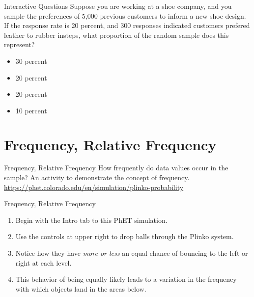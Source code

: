 \documentclass{beamer}
\begin{document}
\begin{frame}{Interactive Questions}
Suppose you are working at a shoe company, and you sample the preferences of 5,000 previous customers to inform a new shoe design.  If the response rate is 20 percent, and 300 responses indicated customers prefered leather to rubber insteps, what proportion of the random sample does this represent?
\begin{itemize}
\item 30 percent
\item 20 percent
\item 20 percent
\item 10 percent
\end{itemize}

\end{frame}

\section{Frequency, Relative Frequency}

\begin{frame}{Frequency, Relative Frequency}
\alert{How frequently do data values occur in the sample?}
An activity to demonstrate the concept of frequency. \\ \vspace{0.5cm}
\url{https://phet.colorado.edu/en/simulation/plinko-probability}
\end{frame}

\begin{frame}{Frequency, Relative Frequency}
\begin{enumerate}
\item Begin with the Intro tab to this PhET simulation.
\item Use the controls at upper right to drop balls through the Plinko system.
\item Notice how they have \textit{more or less} an equal chance of bouncing to the left or right at each level.
\item This behavior of being equally likely leads to a variation in the frequency with which objects land in the areas below.
\end{enumerate}
\end{frame}
\end{document}
